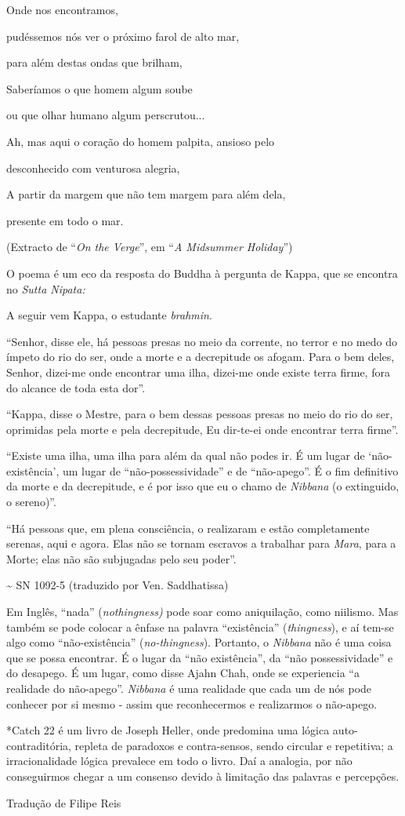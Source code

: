 Onde nos encontramos,

pudéssemos nós ver o próximo farol de alto mar,

para além destas ondas que brilham,

Saberíamos o que homem algum soube

ou que olhar humano algum perscrutou...

Ah, mas aqui o coração do homem palpita, ansioso pelo

desconhecido com venturosa alegria,

A partir da margem que não tem margem para além dela,

presente em todo o mar.

(Extracto de ``\emph{On the Verge}'', em ``\emph{A Midsummer Holiday}'')

O poema é um eco da resposta do Buddha à pergunta de Kappa, que se
encontra no \emph{Sutta Nipata:}

A seguir vem Kappa, o estudante \emph{brahmin}.

``Senhor, disse ele, há pessoas presas no meio da corrente, no terror e
no medo do ímpeto do rio do ser, onde a morte e a decrepitude os afogam.
Para o bem deles, Senhor, dizei-me onde encontrar uma ilha, dizei-me
onde existe terra firme, fora do alcance de toda esta dor''.

``Kappa, disse o Mestre, para o bem dessas pessoas presas no meio do rio
do ser, oprimidas pela morte e pela decrepitude, Eu dir-te-ei onde
encontrar terra firme''.

``Existe uma ilha, uma ilha para além da qual não podes ir. É um lugar
de `não-existência', um lugar de ``não-possessividade'' e de
``não-apego''. É o fim definitivo da morte e da decrepitude, e é por
isso que eu o chamo de \emph{Nibbana} (o extinguido, o sereno)''.

``Há pessoas que, em plena consciência, o realizaram e estão
completamente serenas, aqui e agora. Elas não se tornam escravos a
trabalhar para \emph{Mara}, para a Morte; elas não são subjugadas pelo
seu poder''.

\textasciitilde{} SN 1092-5 (traduzido por Ven. Saddhatissa)

Em Inglês, ``nada'' (\emph{nothingness)} pode soar como aniquilação,
como niilismo. Mas também se pode colocar a ênfase na palavra
``existência'' (\emph{thingness}), e aí tem-se algo como
``não-existência'' (\emph{no-thingness}). Portanto, o \emph{Nibbana} não
é uma coisa que se possa encontrar. É o lugar da ``não existência'', da
``não possessividade'' e do desapego. É um lugar, como disse Ajahn Chah,
onde se experiencia ``a realidade do não-apego''. \emph{Nibbana} é uma
realidade que cada um de nós pode conhecer por si mesmo - assim que
reconhecermos e realizarmos o não-apego.

*Catch 22 é um livro de Joseph Heller, onde predomina uma lógica
auto-contraditória, repleta de paradoxos e contra-sensos, sendo circular
e repetitiva; a irracionalidade lógica prevalece em todo o livro. Daí a
analogia, por não conseguirmos chegar a um consenso devido à limitação
das palavras e percepções.

Tradução de Filipe Reis
